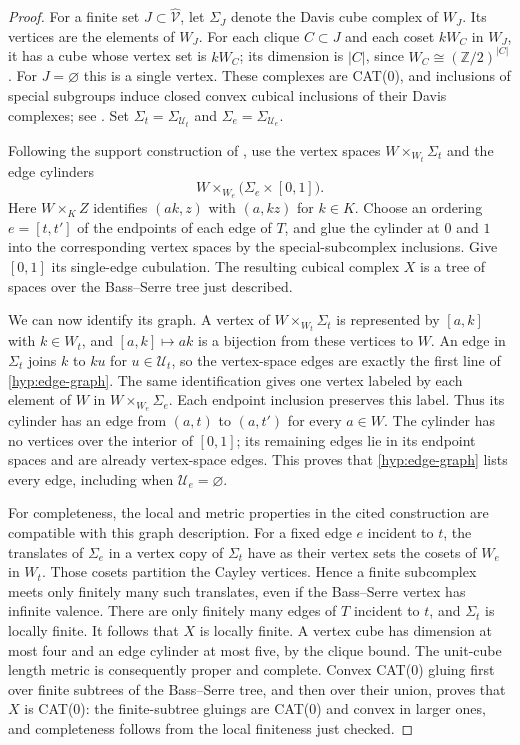 \begin{proof}
For a finite set \(J\subset\widehat{\mathcal V}\), let \(\Sigma_J\)
denote the Davis cube complex of \(W_J\).  Its vertices are the elements
of \(W_J\).  For each clique \(C\subset J\) and each coset \(kW_C\)
in \(W_J\), it has a cube whose vertex set is \(kW_C\); its dimension
is \(|C|\), since \(W_C\cong(\mathbb Z/2)^{|C|}\).  For \(J=\varnothing\)
this is a single vertex.  These complexes are CAT(0), and inclusions
of special subgroups induce closed convex cubical inclusions of their
Davis complexes; see \cite[Chapters~7 and~12]{Davis2008}.  Set
\(\Sigma_t=\Sigma_{\mathcal U_t}\) and
\(\Sigma_e=\Sigma_{\mathcal U_e}\).

Following the support construction of \cite[Lemma~3.3]{PD}, use the
vertex spaces \(W\times_{W_t}\Sigma_t\) and the edge cylinders
\[
W\times_{W_e}\bigl(\Sigma_e\times[0,1]\bigr).
\]
Here \(W\times_K Z\) identifies \((ak,z)\) with \((a,kz)\) for
\(k\in K\).  Choose an ordering \(e=[t,t']\) of the endpoints of each
edge of \(T\), and glue the cylinder at \(0\) and \(1\) into the
corresponding vertex spaces by the special-subcomplex inclusions.
Give \([0,1]\) its single-edge cubulation.  The resulting cubical
complex \(X\) is a tree of spaces over the Bass--Serre tree just
described.

We can now identify its graph.  A vertex of \(W\times_{W_t}\Sigma_t\)
is represented by \([a,k]\) with \(k\in W_t\), and
\([a,k]\mapsto ak\) is a bijection from these vertices to \(W\).
An edge in \(\Sigma_t\) joins \(k\) to \(ku\) for
\(u\in\mathcal U_t\), so the vertex-space edges are exactly the first
line of \eqref{hyp:edge-graph}.  The same identification gives one
vertex labeled by each element of \(W\) in
\(W\times_{W_e}\Sigma_e\).  Each endpoint inclusion preserves this
label.  Thus its cylinder has an edge from \((a,t)\) to \((a,t')\)
for every \(a\in W\).  The cylinder has no vertices over the interior
of \([0,1]\); its remaining edges lie in its endpoint spaces and are
already vertex-space edges.  This proves that
\eqref{hyp:edge-graph} lists every edge, including when
\(\mathcal U_e=\varnothing\).

For completeness, the local and metric properties in the cited
construction are compatible with this graph description.  For a fixed
edge \(e\) incident to \(t\), the translates of \(\Sigma_e\) in a
vertex copy of \(\Sigma_t\) have as their vertex sets the cosets of
\(W_e\) in \(W_t\).  Those cosets partition the Cayley vertices.
Hence a finite subcomplex meets only finitely many such translates,
even if the Bass--Serre vertex has infinite valence.  There are only
finitely many edges of \(T\) incident to \(t\), and \(\Sigma_t\) is
locally finite.  It follows that \(X\) is locally finite.  A vertex
cube has dimension at most four and an edge cylinder at most five,
by the clique bound.  The unit-cube length metric is consequently
proper and complete.  Convex CAT(0) gluing first over finite subtrees
of the Bass--Serre tree, and then over their union, proves that \(X\)
is CAT(0): the finite-subtree gluings are CAT(0) and convex in larger
ones, and completeness follows from the local finiteness just checked.


\end{proof}
